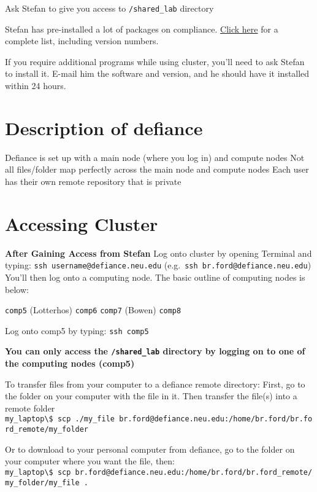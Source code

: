 \documentclass[
  letterpaper,
  DIV=11,
  numbers=noendperiod]{scrreprt}
\begin{document}
Ask Stefan to give you access to \texttt{/shared\_lab} directory

Stefan has pre-installed a lot of packages on compliance.
\href{https://drk-lo.github.io/installedpackages.md}{Click here} for a
complete list, including version numbers.

If you require additional programs while using cluster, you'll need to
ask Stefan to install it. E-mail him the software and version, and he
should have it installed within 24 hours.

\hypertarget{description-of-defiance}{%
\section{\texorpdfstring{\textbf{Description of
defiance}}{Description of defiance}}\label{description-of-defiance}}

Defiance is set up with a main node (where you log in) and compute nodes
Not all files/folder map perfectly across the main node and compute
nodes Each user has their own remote repository that is private

\hypertarget{accessing-cluster}{%
\section{\texorpdfstring{\textbf{Accessing
Cluster}}{Accessing Cluster}}\label{accessing-cluster}}

\textbf{After Gaining Access from Stefan} Log onto cluster by opening
Terminal and typing: \texttt{ssh\ username@defiance.neu.edu}
(e.g.~\texttt{ssh\ br.ford@defiance.neu.edu}) You'll then log onto a
computing node. The basic outline of computing nodes is below:

\texttt{comp5} (Lotterhos) \texttt{comp6} \texttt{comp7} (Bowen)
\texttt{comp8}

Log onto comp5 by typing: \texttt{ssh\ comp5}

\textbf{You can only access the \texttt{/shared\_lab} directory by
logging on to one of the computing nodes (comp5)}

To transfer files from your computer to a defiance remote directory:
First, go to the folder on your computer with the file in it. Then
transfer the file(s) into a remote folder
\texttt{my\_laptop\textbackslash{}\$\ scp\ ./my\_file\ br.ford@defiance.neu.edu:/home/br.ford/br.ford\_remote/my\_folder}

Or to download to your personal computer from defiance, go to the folder
on your computer where you want the file, then:
\texttt{my\_laptop\textbackslash{}\$\ scp\ br.ford@defiance.neu.edu:/home/br.ford/br.ford\_remote/my\_folder/my\_file\ .}
\end{document}
